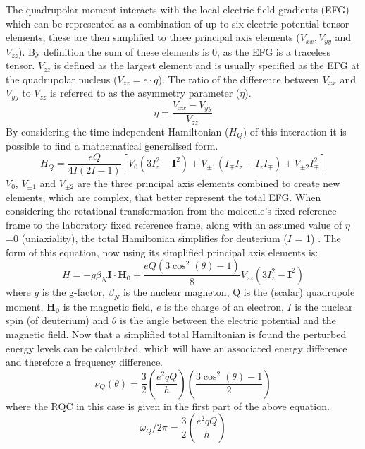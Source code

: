 \documentclass[class=article, crop=false]{standalone}
\begin{document}
The quadrupolar moment interacts with the local electric field gradients (EFG) which can be represented as a combination of up to six electric potential tensor elements, these are then simplified to three principal axis elements ($V_{xx}, V_{yy}$ and $V_{zz}$). By definition the sum of these elements is 0, as the EFG is a traceless tensor. $V_{zz}$ is defined as the largest element and is usually specified as the EFG at the quadrupolar nucleus ($V_{zz} = e\cdot q$)\cite{Elliott2021WhatMedia}. The ratio of the difference between $V_{xx}$ and $V_{yy}$ to $V_{zz}$ is referred to as the asymmetry parameter ($\eta$).
\begin{equation}
    \eta = \frac{V_{xx}-V_{yy}}{V_{zz}}
\end{equation}
By considering the time-independent Hamiltonian ($H_Q$) of this interaction it is possible to find a mathematical generalised form.
\begin{equation}
    H_Q = \frac{eQ}{4I(2I-1)}[V_0(3I^2_z-\boldsymbol{I}^2) + V_{\pm1}(I_{\mp}I_z+I_zI_\mp)+V_{\pm2}I^2_\mp]
\end{equation}
$V_0$, $V_{\pm1}$ and $V_{\pm2}$ are the three principal axis elements combined to create new elements, which are complex, that better represent the total EFG. When considering the rotational transformation from the molecule's fixed reference frame to the laboratory fixed reference frame\cite{Seelig1977DeuteriumMembranes}, along with an assumed value of $\eta$=0 (uniaxiality), the total Hamiltonian simplifies for deuterium ($I$ = 1) \cite{Sharf1995DetectionNMR-Spectroscopy}. The form of this equation, now using its simplified principal axis elements is:
\begin{equation}
    H = -g\beta_N\boldsymbol{I}\cdot\boldsymbol{H_0} + \frac{eQ(3\cos^2(\theta)-1)}{8}V_{zz}(3I_z^2-\boldsymbol{I}^2)
\end{equation}
where $g$ is the g-factor, $\beta_N$ is the nuclear magneton, Q is the (scalar) quadrupole moment, $\boldsymbol{H_0}$ is the magnetic field, $e$ is the charge of an electron, $I$ is the nuclear spin (of deuterium) and $\theta$ is the angle between the electric potential and the magnetic field. Now that a simplified total Hamiltonian is found the perturbed energy levels can be calculated, which will have an associated energy difference and therefore a frequency difference.
\begin{equation}
    \nu_Q(\theta) = \frac{3}{2}\left(\frac{e^2qQ}{h}\right)\left(\frac{3\cos^2(\theta)-1}{2}\right)
    \label{eqn:Quad:Angle}
\end{equation}
where the RQC in this case is given in the first part of the above equation.
\begin{equation}
    \omega_Q/2\pi = \frac{3}{2}\left(\frac{e^2qQ}{h}\right)
    \label{eqn:Quad:RQC}
\end{equation}
\end{document}
